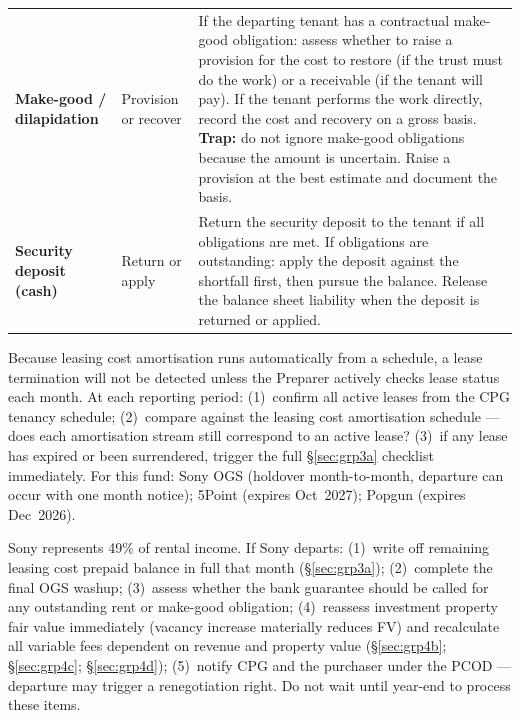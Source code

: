 \documentclass[10pt,a4paper]{article}
\begin{document}
{\begin{longtable}{@{} L{3.2cm} L{2.0cm} L{7.5cm} @{}}
\textbf{Make-good / dilapidation} & Provision or recover & If the departing tenant has a contractual make-good obligation: assess whether to raise a provision for the cost to restore (if the trust must do the work) or a receivable (if the tenant will pay). If the tenant performs the work directly, record the cost and recovery on a gross basis. \textbf{Trap:} do not ignore make-good obligations because the amount is uncertain. Raise a provision at the best estimate and document the basis. \\
\textbf{Security deposit (cash)} & Return or apply & Return the security deposit to the tenant if all obligations are met. If obligations are outstanding: apply the deposit against the shortfall first, then pursue the balance. Release the balance sheet liability when the deposit is returned or applied. \\
\bottomrule
\end{longtable}}

\begin{note}
Because leasing cost amortisation runs automatically from a schedule, a lease termination will not be detected unless the Preparer actively checks lease status each month. At each reporting period: (1)~confirm all active leases from the CPG tenancy schedule; (2)~compare against the leasing cost amortisation schedule --- does each amortisation stream still correspond to an active lease? (3)~if any lease has expired or been surrendered, trigger the full \S\ref{sec:grp3a} checklist immediately. For this fund: Sony OGS (holdover month-to-month, departure can occur with one month notice); 5Point (expires Oct~2027); Popgun (expires Dec~2026).
\end{note}

\begin{warning}
Sony represents 49\% of rental income. If Sony departs: (1)~write off remaining leasing cost prepaid balance in full that month (\S\ref{sec:grp3a}); (2)~complete the final OGS washup; (3)~assess whether the bank guarantee should be called for any outstanding rent or make-good obligation; (4)~reassess investment property fair value immediately (vacancy increase materially reduces FV) and recalculate all variable fees dependent on revenue and property value (\S\ref{sec:grp4b}; \S\ref{sec:grp4c}; \S\ref{sec:grp4d}); (5)~notify CPG and the purchaser under the PCOD --- departure may trigger a renegotiation right. Do not wait until year-end to process these items.
\end{warning}
\end{document}
